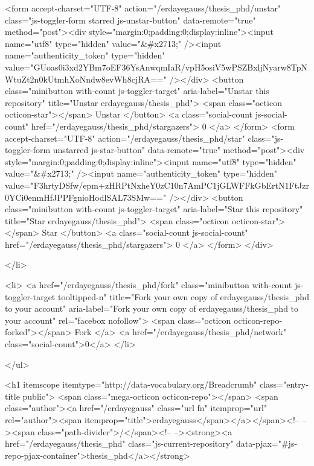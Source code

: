     <form accept-charset="UTF-8" action="/erdayegauss/thesis_phd/unstar" class="js-toggler-form starred js-unstar-button" data-remote="true" method="post"><div style="margin:0;padding:0;display:inline"><input name="utf8" type="hidden" value="&#x2713;" /><input name="authenticity_token" type="hidden" value="GUoas0i3xd2YBm7oEF36YsAnwqmIaR/vpH5osiV5wPSZBxljNyarw8TpNWtuZt2n0kUtmhXoNndw8evWh8cjRA==" /></div>
      <button
        class="minibutton with-count js-toggler-target"
        aria-label="Unstar this repository" title="Unstar erdayegauss/thesis_phd">
        <span class="octicon octicon-star"></span>
        Unstar
      </button>
        <a class="social-count js-social-count" href="/erdayegauss/thesis_phd/stargazers">
          0
        </a>
</form>
    <form accept-charset="UTF-8" action="/erdayegauss/thesis_phd/star" class="js-toggler-form unstarred js-star-button" data-remote="true" method="post"><div style="margin:0;padding:0;display:inline"><input name="utf8" type="hidden" value="&#x2713;" /><input name="authenticity_token" type="hidden" value="F3hrtyDSfw/epm+zHRPtNxheY0zC10n7AmPC1jGLWFFkGbErtN1FtJzr0YCi0enmHfJPPFgnioHodlSAL73SMw==" /></div>
      <button
        class="minibutton with-count js-toggler-target"
        aria-label="Star this repository" title="Star erdayegauss/thesis_phd">
        <span class="octicon octicon-star"></span>
        Star
      </button>
        <a class="social-count js-social-count" href="/erdayegauss/thesis_phd/stargazers">
          0
        </a>
</form>  </div>

  </li>

        <li>
          <a href="/erdayegauss/thesis_phd/fork" class="minibutton with-count js-toggler-target tooltipped-n" title="Fork your own copy of erdayegauss/thesis_phd to your account" aria-label="Fork your own copy of erdayegauss/thesis_phd to your account" rel="facebox nofollow">
            <span class="octicon octicon-repo-forked"></span>
            Fork
          </a>
          <a href="/erdayegauss/thesis_phd/network" class="social-count">0</a>
        </li>

</ul>

        <h1 itemscope itemtype="http://data-vocabulary.org/Breadcrumb" class="entry-title public">
          <span class="mega-octicon octicon-repo"></span>
          <span class="author"><a href="/erdayegauss" class="url fn" itemprop="url" rel="author"><span itemprop="title">erdayegauss</span></a></span><!--
       --><span class="path-divider">/</span><!--
       --><strong><a href="/erdayegauss/thesis_phd" class="js-current-repository" data-pjax="#js-repo-pjax-container">thesis_phd</a></strong>

